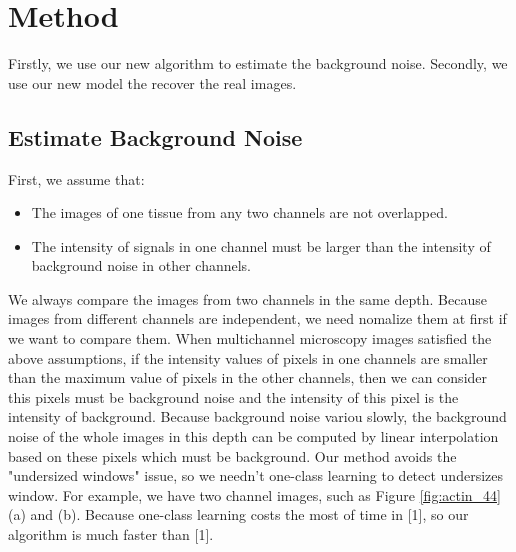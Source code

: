\documentclass{article}
\begin{document}
\section{Method}
\label{sec:format}
Firstly, we use our new algorithm to estimate the background noise. Secondly, we use our new model the recover the real images.
\subsection{Estimate Background Noise}
First, we assume that:
\begin{itemize}
	\item The images of one tissue from any two channels are not overlapped.
	\item The intensity of signals in one channel must be larger than the intensity of background noise in other channels.
\end{itemize}
We always compare the images from two channels in the same depth. Because images from different channels are independent, we need nomalize them at first if we want to compare them. When multichannel microscopy images satisfied the above assumptions, if the intensity values of pixels in one channels are smaller than the maximum value of pixels in the other channels, then we can consider this pixels must be background noise and the intensity of this pixel is the intensity of background. Because background noise variou slowly, the background noise of the whole images in this depth can be computed by linear interpolation based on these pixels which must be background. Our method avoids the "undersized windows" issue, so we needn't one-class learning to detect undersizes window. For example, we have two channel images, such as Figure \ref{fig:actin_44} (a) and (b). Because one-class learning costs the most of time in [1], so our algorithm is much faster than [1].   \\
\end{document}
